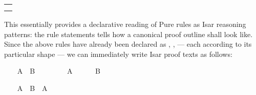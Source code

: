 \begin{isabellebody}
\begin{isamarkuptext}
\begin{tabular}{l}
  \isa{{\isaliteral{22}{\isachardoublequote}}exI{\isaliteral{3A}{\isacharcolon}}\ {\isaliteral{5C3C415353554D45533E}{\isasymASSUMES}}\ B\ a\ {\isaliteral{5C3C53484F57533E}{\isasymSHOWS}}\ {\isaliteral{5C3C6578697374733E}{\isasymexists}}x{\isaliteral{2E}{\isachardot}}\ B\ x{\isaliteral{22}{\isachardoublequote}}} \\
  \isa{{\isaliteral{22}{\isachardoublequote}}exE{\isaliteral{3A}{\isacharcolon}}\ {\isaliteral{5C3C415353554D45533E}{\isasymASSUMES}}\ {\isaliteral{5C3C6578697374733E}{\isasymexists}}x{\isaliteral{2E}{\isachardot}}\ B\ x\ {\isaliteral{5C3C4F425441494E533E}{\isasymOBTAINS}}\ a\ {\isaliteral{5C3C57484552453E}{\isasymWHERE}}\ B\ a{\isaliteral{22}{\isachardoublequote}}}
  \end{tabular}
  \medskip

  \noindent This essentially provides a declarative reading of Pure
  rules as Isar reasoning patterns: the rule statements tells how a
  canonical proof outline shall look like.  Since the above rules have
  already been declared as \hyperlink{attribute.Pure.intro}{\mbox{}}, \hyperlink{attribute.Pure.elim}{\mbox{}}, \hyperlink{attribute.Pure.dest}{\mbox{}} --- each according to its
  particular shape --- we can immediately write Isar proof texts as
  follows:%
\end{isamarkuptext}%
\isamarkuptrue%
%
\isadelimproof
%
\endisadelimproof
%
\isatagproof
%
\begin{minipage}[t]{0.4\textwidth}
\isanewline
\ \ \isamarkupfalse%
\ {}A\ {}\ B{}\isanewline
\ \ \isamarkupfalse%
\isanewline
\ \ \ \ \isamarkupfalse%
\ A\isanewline
\ \ \ \ \isamarkupfalse%
\ B%
\endisatagproof
{\isafoldproof}%
%
\isadelimproof
%
\endisadelimproof
%
\isadelimnoproof
\ %
\endisadelimnoproof
%
\isatagnoproof
{}\isamarkupfalse%
%
\endisatagnoproof
{\isafoldnoproof}%
%
\isadelimnoproof
\isanewline
%
\endisadelimnoproof
%
\isadelimproof
\ \ %
\endisadelimproof
%
\isatagproof
{}\isamarkupfalse%
%
\end{minipage}\qquad\begin{minipage}[t]{0.4\textwidth}
\isanewline
\ \ \isamarkupfalse%
\ {}A\ {}\ B{}\ \ A%

\end{minipage}
\end{isabellebody}
